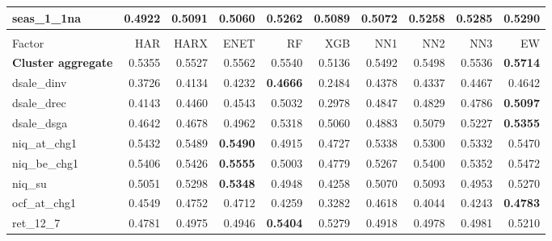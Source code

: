 \begin{longtable}{>{\raggedright\arraybackslash}p{2.6cm}rrrrrrrrr}
seas\_1\_1na & 0.4922 & \cellcolor{blue!10}0.5091 & \cellcolor{blue!10}0.5060 & \cellcolor{blue!10}0.5262 & \cellcolor{blue!10}0.5089 & \cellcolor{blue!10}0.5072 & \cellcolor{blue!10}0.5258 & \cellcolor{blue!10}0.5285 & \textbf{\cellcolor{blue!10}0.5290} \\
\hline
\multicolumn{10}{@{}l}{\textit{Panel G. Profit Growth}} \\
\hline
Factor & HAR & HARX & ENET & RF & XGB & NN1 & NN2 & NN3 & EW \\
\hline
\textbf{Cluster aggregate} & 0.5355 & \cellcolor{blue!10}0.5527 & \cellcolor{blue!10}0.5562 & \cellcolor{blue!10}0.5540 & 0.5136 & \cellcolor{blue!10}0.5492 & \cellcolor{blue!10}0.5498 & \cellcolor{blue!10}0.5536 & \textbf{\cellcolor{blue!10}0.5714} \\
dsale\_dinv & 0.3726 & \cellcolor{blue!10}0.4134 & \cellcolor{blue!10}0.4232 & \textbf{\cellcolor{blue!10}0.4666} & 0.2484 & \cellcolor{blue!10}0.4378 & \cellcolor{blue!10}0.4337 & \cellcolor{blue!10}0.4467 & \cellcolor{blue!10}0.4642 \\
dsale\_drec & 0.4143 & \cellcolor{blue!10}0.4460 & \cellcolor{blue!10}0.4543 & \cellcolor{blue!10}0.5032 & 0.2978 & \cellcolor{blue!10}0.4847 & \cellcolor{blue!10}0.4829 & \cellcolor{blue!10}0.4786 & \textbf{\cellcolor{blue!10}0.5097} \\
dsale\_dsga & 0.4642 & \cellcolor{blue!10}0.4678 & \cellcolor{blue!10}0.4962 & \cellcolor{blue!10}0.5318 & \cellcolor{blue!10}0.5060 & \cellcolor{blue!10}0.4883 & \cellcolor{blue!10}0.5079 & \cellcolor{blue!10}0.5227 & \textbf{\cellcolor{blue!10}0.5355} \\
niq\_at\_chg1 & 0.5432 & \cellcolor{blue!10}0.5489 & \textbf{\cellcolor{blue!10}0.5490} & 0.4915 & 0.4727 & 0.5338 & 0.5300 & 0.5332 & \cellcolor{blue!10}0.5470 \\
niq\_be\_chg1 & 0.5406 & \cellcolor{blue!10}0.5426 & \textbf{\cellcolor{blue!10}0.5555} & 0.5003 & 0.4779 & 0.5267 & 0.5400 & 0.5352 & \cellcolor{blue!10}0.5472 \\
niq\_su & 0.5051 & \cellcolor{blue!10}0.5298 & \textbf{\cellcolor{blue!10}0.5348} & 0.4948 & 0.4258 & \cellcolor{blue!10}0.5070 & \cellcolor{blue!10}0.5093 & 0.4953 & \cellcolor{blue!10}0.5270 \\
ocf\_at\_chg1 & 0.4549 & \cellcolor{blue!10}0.4752 & \cellcolor{blue!10}0.4712 & 0.4259 & 0.3282 & \cellcolor{blue!10}0.4618 & 0.4044 & 0.4243 & \textbf{\cellcolor{blue!10}0.4783} \\
ret\_12\_7 & 0.4781 & \cellcolor{blue!10}0.4975 & \cellcolor{blue!10}0.4946 & \textbf{\cellcolor{blue!10}0.5404} & \cellcolor{blue!10}0.5279 & \cellcolor{blue!10}0.4918 & \cellcolor{blue!10}0.4978 & \cellcolor{blue!10}0.4981 & \cellcolor{blue!10}0.5210 \\

\end{longtable}
